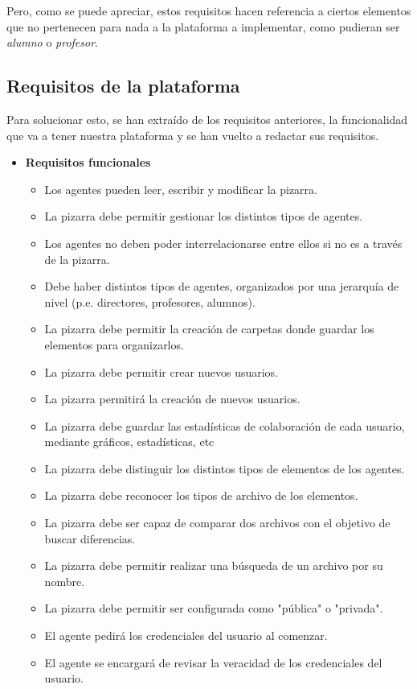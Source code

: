 Pero, como se puede apreciar, estos requisitos hacen referencia a ciertos elementos que no pertenecen para nada a la plataforma a implementar, como pudieran ser \emph{alumno} o \emph{profesor}.

\subsection{Requisitos de la plataforma}
Para solucionar esto, se han extraído de los requisitos anteriores, la funcionalidad que va a tener nuestra plataforma y se han vuelto a redactar sus requisitos.

\begin{itemize}
\item \textbf{Requisitos funcionales}
		\begin{itemize}
			\item Los agentes pueden leer, escribir y modificar la pizarra.
			\item La pizarra debe permitir gestionar los distintos tipos de agentes.
			\item Los agentes no deben poder interrelacionarse entre ellos si no es a través de la pizarra.
			\item Debe haber distintos tipos de agentes, organizados por una jerarquía de nivel (p.e. directores, profesores, alumnos).
			\item La pizarra debe permitir la creación de carpetas donde guardar los elementos para organizarlos.
			\item La pizarra debe permitir crear nuevos usuarios.
			\item La pizarra permitirá la creación de nuevos usuarios.
			\item La pizarra debe guardar las estadísticas de colaboración de cada usuario, mediante gráficos, estadísticas, etc
			\item La pizarra debe distinguir los distintos tipos de elementos de los agentes.
			\item La pizarra debe reconocer los tipos de archivo de los elementos.
			\item La pizarra debe ser capaz de comparar dos archivos con el objetivo de buscar diferencias.
			\item La pizarra debe permitir realizar una búsqueda de un archivo por su nombre.
			\item La pizarra debe permitir ser configurada como "pública" o "privada".
			\item El agente pedirá los credenciales del usuario al comenzar.
			\item El agente se encargará de revisar la veracidad de los credenciales del usuario.

\end{itemize}
\end{itemize}

